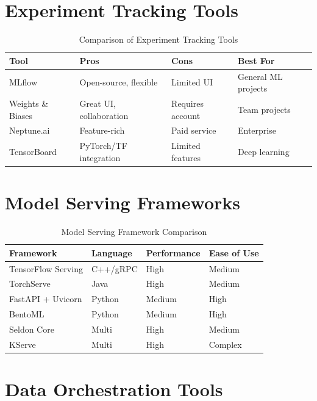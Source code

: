 \section{Experiment Tracking Tools}

\begin{table}[h]
\centering
\caption{Comparison of Experiment Tracking Tools}
\begin{tabular}{@{}llll@{}}
\toprule
\textbf{Tool} & \textbf{Pros} & \textbf{Cons} & \textbf{Best For} \\
\midrule
MLflow & Open-source, flexible & Limited UI & General ML projects \\
Weights \& Biases & Great UI, collaboration & Requires account & Team projects \\
Neptune.ai & Feature-rich & Paid service & Enterprise \\
TensorBoard & PyTorch/TF integration & Limited features & Deep learning \\
\bottomrule
\end{tabular}
\end{table}

\section{Model Serving Frameworks}

\begin{table}[h]
\centering
\caption{Model Serving Framework Comparison}
\begin{tabular}{@{}llll@{}}
\toprule
\textbf{Framework} & \textbf{Language} & \textbf{Performance} & \textbf{Ease of Use} \\
\midrule
TensorFlow Serving & C++/gRPC & High & Medium \\
TorchServe & Java & High & Medium \\
FastAPI + Uvicorn & Python & Medium & High \\
BentoML & Python & Medium & High \\
Seldon Core & Multi & High & Medium \\
KServe & Multi & High & Complex \\
\bottomrule
\end{tabular}
\end{table}

\section{Data Orchestration Tools}

